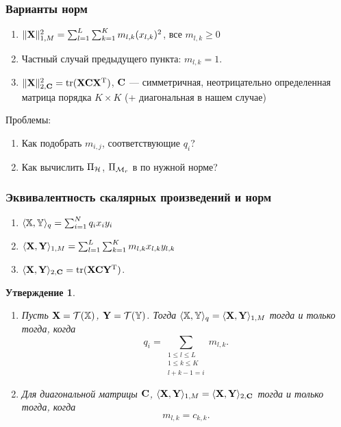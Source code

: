 \documentclass[unicode, notheorems]{beamer}
\newtheorem{proposition}{Утверждение}
\begin{document}
\begin{frame}
	\frametitle{Варианты норм}
		\begin{enumerate}
			\item $\|\mathbf{X}\|_{1, M}^2 = \sum_{l = 1}^L \sum_{k = 1}^K m_{l, k} (x_{l, k})^2$, все $m_{l, k} \ge 0$
			\item Частный случай предыдущего пункта: $m_{l, k} = 1$.
			\item $\|\mathbf{X}\|_{2, \mathbf{C}}^2 = \text{tr}(\mathbf{X} \mathbf{C} \mathbf{X}^{\mathrm{T}})$, $\mathbf{C}$ --- симметричная, неотрицательно определенная матрица порядка $K \times K$ (+ диагональная в нашем случае)
		\end{enumerate}
		
		\vspace{0.4cm}
		Проблемы:
		\begin{enumerate}
			\item Как подобрать $m_{i, j}$, соответствующие $q_i$?
			\item Как вычислить $\Pi_{\mathcal{H}}$, $\Pi_{\mathcal{M}_r}$ в по нужной норме?
		\end{enumerate}
\end{frame}

\begin{frame}
	\frametitle{Эквивалентность скалярных произведений и норм}
	\begin{enumerate}
		\item $\langle \mathbb{X}, \mathbb{Y} \rangle_q = \sum_{i=1}^N q_i x_i  y_i$
		\item $\langle\mathbf{X}, \mathbf{Y} \rangle_{1, M} = \sum_{l = 1}^L \sum_{k = 1}^K m_{l, k} x_{l, k} y_{l, k}$
		\item $\langle\mathbf{X}, \mathbf{Y}\rangle_{2, \mathbf{C}} = \text{tr}(\mathbf{X} \mathbf{C} \mathbf{Y}^{\mathrm{T}})$.
	\end{enumerate}
	\begin{proposition}
		\small
	    \begin{enumerate}
		\item Пусть $\mathbf{X} = \mathcal{T}(\mathbb{X})$,  $\mathbf{Y} = \mathcal{T}(\mathbb{Y})$. Тогда $\langle\mathbb{X},\mathbb{Y}\rangle_q= \langle\mathbf{X},\mathbf{Y}\rangle_{1, M}$ тогда и только тогда, когда
		\begin{equation*}
		q_i = \sum_{\substack{1 \le l \le L \\ 1 \le k \le K \\ l+k-1=i}} m_{l,k}.
		\end{equation*}
		
		\item Для диагональной матрицы $\mathbf{C}$, $\langle \mathbf{X},\mathbf{Y} \rangle_{1, M}= \langle \mathbf{X},\mathbf{Y} \rangle_{2, \mathbf{C}}$ тогда и только тогда, когда
		\begin{equation*}
		m_{l,k}=c_{k,k}.
		\end{equation*}
	    \end{enumerate}
	\end{proposition}
	
\end{frame}
\end{document}
